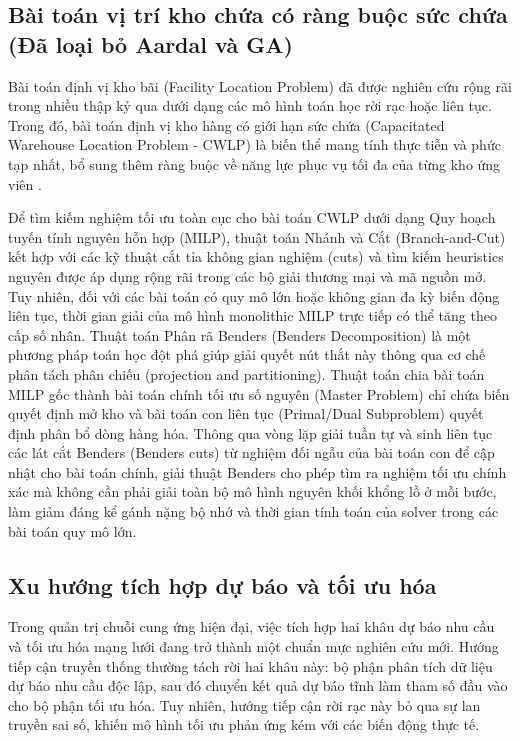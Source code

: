 \subsection{Bài toán vị trí kho chứa có ràng buộc sức chứa (Đã loại bỏ Aardal và GA)}
Bài toán định vị kho bãi (Facility Location Problem) đã được nghiên cứu rộng rãi trong nhiều thập kỷ qua dưới dạng các mô hình toán học rời rạc hoặc liên tục. Trong đó, bài toán định vị kho hàng có giới hạn sức chứa (Capacitated Warehouse Location Problem - CWLP) là biến thể mang tính thực tiễn và phức tạp nhất, bổ sung thêm ràng buộc về năng lực phục vụ tối đa của từng kho ứng viên \cite{milazzo2022, aardal1998}.

Để tìm kiếm nghiệm tối ưu toàn cục cho bài toán CWLP dưới dạng Quy hoạch tuyến tính nguyên hỗn hợp (MILP), thuật toán Nhánh và Cắt (Branch-and-Cut) kết hợp với các kỹ thuật cắt tỉa không gian nghiệm (cuts) và tìm kiếm heuristics nguyên được áp dụng rộng rãi trong các bộ giải thương mại và mã nguồn mở. Tuy nhiên, đối với các bài toán có quy mô lớn hoặc không gian đa kỳ biến động liên tục, thời gian giải của mô hình monolithic MILP trực tiếp có thể tăng theo cấp số nhân. Thuật toán Phân rã Benders (Benders Decomposition) \cite{sadatasl2021} là một phương pháp toán học đột phá giúp giải quyết nút thắt này thông qua cơ chế phân tách phân chiếu (projection and partitioning). Thuật toán chia bài toán MILP gốc thành bài toán chính tối ưu số nguyên (Master Problem) chỉ chứa biến quyết định mở kho và bài toán con liên tục (Primal/Dual Subproblem) quyết định phân bổ dòng hàng hóa. Thông qua vòng lặp giải tuần tự và sinh liên tục các lát cắt Benders (Benders cuts) từ nghiệm đối ngẫu của bài toán con để cập nhật cho bài toán chính, giải thuật Benders cho phép tìm ra nghiệm tối ưu chính xác mà không cần phải giải toàn bộ mô hình nguyên khối khổng lồ ở mỗi bước, làm giảm đáng kể gánh nặng bộ nhớ và thời gian tính toán của solver trong các bài toán quy mô lớn.

\subsection{Xu hướng tích hợp dự báo và tối ưu hóa}
Trong quản trị chuỗi cung ứng hiện đại, việc tích hợp hai khâu dự báo nhu cầu và tối ưu hóa mạng lưới đang trở thành một chuẩn mực nghiên cứu mới. Hướng tiếp cận truyền thống thường tách rời hai khâu này: bộ phận phân tích dữ liệu dự báo nhu cầu độc lập, sau đó chuyển kết quả dự báo tĩnh làm tham số đầu vào cho bộ phận tối ưu hóa. Tuy nhiên, hướng tiếp cận rời rạc này bỏ qua sự lan truyền sai số, khiến mô hình tối ưu phản ứng kém với các biến động thực tế.

